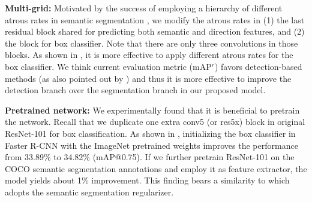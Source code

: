 \textbf{Multi-grid:} Motivated by the success of employing a hierarchy of different atrous rates in semantic segmentation \cite{wang2017understanding, dai2017deformable, chen2017rethinking}, we modify the atrous rates in (1) the last residual block shared for predicting both semantic and direction features, and (2) the block for box classifier. Note that there are only three convolutions in those blocks. As shown in , it is more effective to apply different atrous rates for the box classifier. We think current evaluation metric (mAP$^r$) favors detection-based methods (as also pointed out by \cite{bai2017deep}) and thus it is more effective to improve the detection branch over the segmentation branch in our proposed model.

\begin{table}[!t]
  \centering
  \caption{Multi-grid performance (mAP@0.75). Within the parentheses, we show the three atrous rates used for the three convolutions in the residual block. It is effective to adopt different atrous rates for the box classifier. Further marginal improvement is obtained when we also change the atrous rates in the last block that is shared by semantic segmentation and direction prediction logits.}
  \label{tab:multi_grid}
\end{table}



\textbf{Pretrained network:} We experimentally found that it is beneficial to pretrain the network. Recall that we duplicate one extra conv5 (or res5x) block in original ResNet-101 for box classification. As shown in , initializing the box classifier in Faster R-CNN with the ImageNet pretrained weights improves the performance from 33.89\% to 34.82\% (mAP@0.75). If we further pretrain ResNet-101 on the COCO semantic segmentation annotations and employ it as feature extractor, the model yields about 1\% improvement. This finding bears a similarity to \cite{bell2016inside} which adopts the semantic segmentation regularizer.

